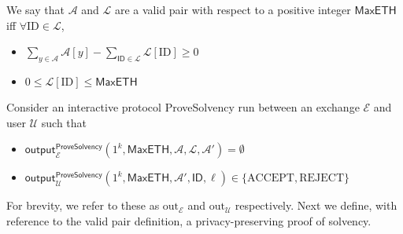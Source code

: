 \begin{definition}
\label{def:1}

We say that $\mathcal{A}$ and $\mathcal{L}$ are a valid pair with respect to a positive integer $\mathsf{MaxETH}$ iff $\forall \text{ID} \in \mathcal{L}$,

\begin{itemize}
\item $\sum_{y \in \mathcal{A}} \mathcal{A}[y] - \sum_{\mathsf{ID} \in \mathcal{L}} \mathcal{L}[\text{ID}] \geq 0 \quad$
\item $0 \leq \mathcal{L}[\text{ID}] \leq \mathsf{MaxETH}$
\end{itemize}


Consider an interactive protocol ProveSolvency run between an exchange $\mathcal{E}$ and user $\mathcal{U}$ such that

\begin{itemize}
\item $\mathsf{output}_{\mathcal{E}}^{\mathsf{ProveSolvency}}(1^k, \mathsf{MaxETH}, \mathcal{A}, \mathcal{L}, \mathcal{A}') = \emptyset$
\item $\mathsf{output}_{\mathcal{U}}^{\mathsf{ProveSolvency}}(1^k, \mathsf{MaxETH}, \mathcal{A}', \mathsf{ID}, \ell) \in \{\text{ACCEPT}, \text{REJECT}\}$
\end{itemize}
   
\end{definition}

For brevity, we refer to these as $\text{out}_{\mathcal{E}}$ and $\text{out}_{\mathcal{U}}$ respectively. Next we define, with reference to the valid pair definition, a privacy-preserving proof of solvency.


